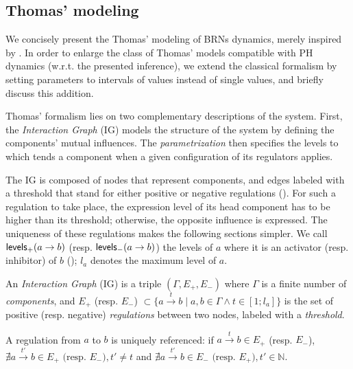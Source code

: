 \subsection{Thomas' modeling}
We concisely present the Thomas' modeling of BRNs dynamics, merely inspired by
\cite{Richard06,BernotSemBRN}.
In order to enlarge the class of Thomas' models compatible with PH dynamics (w.r.t. the presented
inference), we extend the classical formalism by setting parameters to intervals of values instead of single
values, and briefly discuss this addition.

Thomas' formalism lies on two complementary descriptions of the system. First, the
\emph{Interaction Graph} (IG) models the structure of the system by defining the components'
mutual influences.
The \emph{parametrization} then specifies the levels to which tends a component when a given
configuration of its regulators applies.

The IG is composed of nodes that represent components, and edges labeled with a threshold that stand
for either positive or negative regulations ().
For such a regulation to take place, the expression level of its head component has to be higher than its threshold; otherwise, the opposite influence is expressed.
The uniqueness of these regulations makes the following sections simpler.
We call $\mathsf{levels}_+(a\rightarrow b)$ (resp. $\mathsf{levels}_-(a\rightarrow b)$) the levels of $a$ where it is an
activator (resp. inhibitor) of $b$ ();
$l_a$ denotes the maximum level of $a$.

\begin{definition}
\label{def:ig}
An \emph{Interaction Graph} (IG) is a triple $(\Gamma, E_+, E_-)$ where $\Gamma$ is a finite number of \emph{components},
and $E_+$ (resp. $E_-$) $\subset \{a \xrightarrow{t} b \mid a, b \in \Gamma \wedge t \in [1; l_a]\}$
is the set of positive (resp. negative) \emph{regulations} between two nodes, labeled with a \emph{threshold}.

A regulation from $a$ to $b$ is uniquely referenced:
if $a \xrightarrow{t} b \in E_+$ (resp. $E_-$),
$\nexists a \xrightarrow{t'} b \in E_+ \text{ (resp. $E_-$)}, t' \neq t$
and $\nexists a \xrightarrow{t'} b \in E_-\text{ (resp. $E_+$)}, t' \in \mathbb{N}$.
\end{definition}

